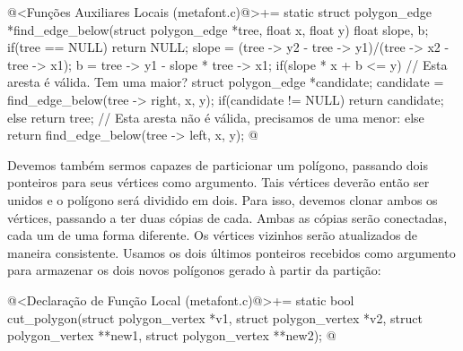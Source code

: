 {{{{{{\iniciocodigo
@<Funções Auxiliares Locais (metafont.c)@>+=
static struct polygon_edge *find_edge_below(struct polygon_edge *tree,
                                            float x, float y){
  float slope, b;
  if(tree == NULL)
    return NULL;
  slope = (tree -> y2 - tree -> y1)/(tree -> x2 - tree -> x1);
  b = tree -> y1 - slope * tree -> x1;
  if(slope * x + b <= y){ // Esta aresta é válida. Tem uma maior?
    struct polygon_edge *candidate;
    candidate = find_edge_below(tree -> right, x, y);
    if(candidate != NULL)
      return candidate;
    else return tree;
  }
  // Esta aresta não é válida, precisamos de uma menor:
  else return find_edge_below(tree -> left, x, y);
}
@
\fimcodigo

Devemos também sermos capazes de particionar um polígono, passando
dois ponteiros para seus vértices como argumento. Tais vértices
deverão então ser unidos e o polígono será dividido em dois. Para
isso, devemos clonar ambos os vértices, passando a ter duas cópias de
cada. Ambas as cópias serão conectadas, cada um de uma forma
diferente. Os vértices vizinhos serão atualizados de maneira
consistente. Usamos os dois últimos ponteiros recebidos como argumento
para armazenar os dois novos polígonos gerado à partir da partição:

\iniciocodigo
@<Declaração de Função Local (metafont.c)@>+=
static bool cut_polygon(struct polygon_vertex *v1, struct polygon_vertex *v2,
                        struct polygon_vertex **new1,
                        struct polygon_vertex **new2);
@
\fimcodigo


}}}}}}
